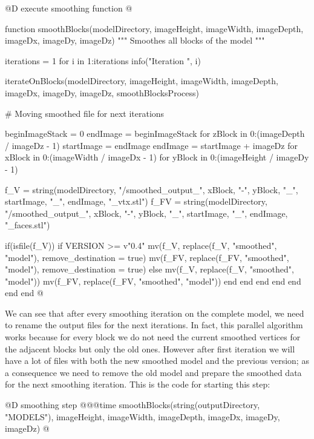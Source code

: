 \documentclass[11pt,oneside]{article}	%
\begin{document}
@D execute smoothing function
@{function smoothBlocks(modelDirectory,
                      imageHeight, imageWidth, imageDepth,
                      imageDx, imageDy, imageDz)
  """
  Smoothes all blocks of the
  model
  """
   
  iterations = 1
  for i in 1:iterations
    info("Iteration ", i)

    iterateOnBlocks(modelDirectory,
                    imageHeight, imageWidth, imageDepth,
                    imageDx, imageDy, imageDz,
                    smoothBlocksProcess)

    # Moving smoothed file for next iterations

    beginImageStack = 0
    endImage = beginImageStack
    for zBlock in 0:(imageDepth / imageDz - 1)
      startImage = endImage
      endImage = startImage + imageDz
      for xBlock in 0:(imageWidth / imageDx - 1)
        for yBlock in 0:(imageHeight / imageDy - 1)

          f_V = string(modelDirectory, "/smoothed_output_", xBlock, "-", yBlock, "_",
                       startImage, "_", endImage, "_vtx.stl")
          f_FV = string(modelDirectory, "/smoothed_output_", xBlock, "-", yBlock, "_",
                        startImage, "_", endImage, "_faces.stl")

          if(isfile(f_V))
            if VERSION >= v"0.4"
              mv(f_V, replace(f_V, "smoothed", "model"), remove_destination = true)
              mv(f_FV, replace(f_FV, "smoothed", "model"), remove_destination = true)
            else
              mv(f_V, replace(f_V, "smoothed", "model"))
              mv(f_FV, replace(f_FV, "smoothed", "model"))
            end
          end
        end
      end
    end
  end
end @}

We can see that after every smoothing iteration on the complete model, we need to rename the output files for the next iterations. In fact, this parallel algorithm works because for every block we do not need the current smoothed vertices for the adjacent blocks but only the old ones. However after first iteration we will have a lot of files with both the new smoothed model and the previous version; as a consequence we need to remove the old model and prepare the smoothed data for the next smoothing iteration.
This is the code for starting this step:

@D smoothing step
@{@@time smoothBlocks(string(outputDirectory, "MODELS"),
	      imageHeight, imageWidth, imageDepth,
	      imageDx, imageDy, imageDz) @}
                      
\end{document}
